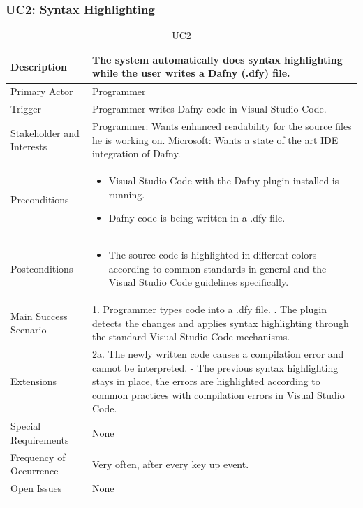 \subsubsection{UC2: Syntax Highlighting}
\begin{longtable}{l | p{} }
	Description & The system automatically does syntax highlighting while the user writes a Dafny (.dfy) file.\\ \hline
	Primary Actor & Programmer\\ \hline
	Trigger & Programmer writes Dafny code in Visual Studio Code.\\ \hline
	Stakeholder and Interests & Programmer: Wants enhanced readability for the source files he is working on. \newline Microsoft: Wants a state of the art IDE integration of Dafny.\\ \hline
	Preconditions &
	\begin{itemize}
		\item Visual Studio Code with the Dafny plugin installed is running.
		\item Dafny code is being written in a .dfy file.
	\end{itemize}\\ \hline
	Postconditions &
	\begin{itemize}
		\item The source code is highlighted in different colors according to common standards in general and the Visual Studio Code guidelines specifically.
	\end{itemize}\\ \hline
	Main Success Scenario & 
	1. Programmer types code into a .dfy file. \newline
	2. The plugin detects the changes and applies syntax highlighting through the standard Visual Studio Code mechanisms.\\ \hline
	Extensions & 
	2a. The newly written code causes a compilation error and cannot be interpreted. \newline 
	- The previous syntax highlighting stays in place, the errors are highlighted according to common practices with compilation errors in Visual Studio Code. \\ \hline
	Special Requirements & None\\ \hline
	Frequency of Occurrence & Very often, after every key up event.\\ \hline
	Open Issues & None \\ \hline
	\caption{UC2}
\end{longtable}

